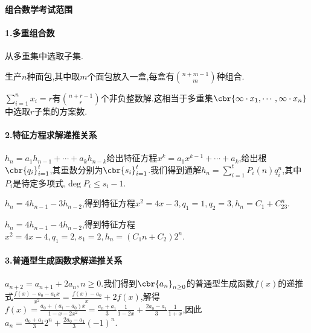 \documentclass{article}
\begin{document}
\begin{center}
    {\Large\textbf{组合数学考试范围}}
\end{center}

\paragraph{1.多重组合数}从多重集中选取子集.
\begin{example}
    生产$n$种面包,其中取$m$个面包放入一盒,每盒有$\binom{n+m-1}{m}$种组合.
\end{example}
\begin{example}
    $\sum_{i=1}^n x_i=r$有$\binom{n+r-1}{r}$个非负整数解.这相当于多重集$\cbr{\infty\cdot x_1,\cdots,\infty\cdot x_n}$中选取$r$子集的方案数.
\end{example}
\paragraph{2.特征方程求解递推关系}$h_n=a_1h_{n-1}+\cdots+a_kh_{n-k}$给出特征方程$x^k=a_1x^{k-1}+\cdots+a_k$,给出根$\cbr{q_i}_{i=1}^t$,其重数分别为$\cbr{s_i}_{i=1}^t$.我们得到通解$h_n=\sum_{i=1}^tP_i(n)q_i^n$,其中$P_i$是待定多项式,$\deg P_i\leq s_i-1$.
\begin{example}
    $h_n=4h_{n-1}-3h_{n-2}$,得到特征方程$x^2=4x-3,q_1=1,q_2=3,h_n=C_1+C_23^n$.

    $h_n=4h_{n-1}-4h_{n-2}$,得到特征方程$x^2=4x-4,q_1=2,s_1=2,h_n=(C_1n+C_2)2^n$.
\end{example}
\paragraph{3.普通型生成函数求解递推关系}
\begin{example}
    $a_{n+2}=a_{n+1}+2a_n,n\geq 0$.我们得到$\cbr{a_n}_{n\geq 0}$的普通型生成函数$f(x)$的递推式$\frac{f(x)-a_0-a_1x}{x^2}=\frac{f(x)-a_0}{x}+2f(x)$,解得$f(x)=\frac{a_0+(a_1-a_0)x}{1-x-2x^2}=\frac{a_0+a_1}{3}\frac{1}{1-2x}+\frac{2a_0-a_1}{3}\frac{1}{1+x}$,因此$a_n=\frac{a_0+a_1}{3}2^n+\frac{2a_0-a_1}{3}(-1)^n$.
\end{example}
\end{document}
